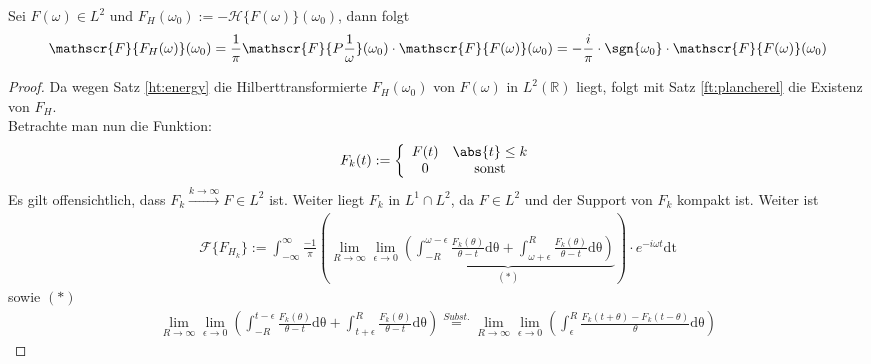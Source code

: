 \begin{satz}\label{kkt:FourierHilbert}
Sei  $F(\omega) \in L^2$ und $F_H(\omega_0):=-\mathscr{H}\{F(\omega)\}{(\omega_0)}$, dann folgt
\begin{align}
	 \mathscr{F}\{F_H(\omega)\}(\omega_0) = \frac{1}{\pi} \mathscr{F}\{P\frac{1}{\omega}\}(\omega_0) \cdot \mathscr{F}\{F(\omega)\}(\omega_0)  = -\frac{i}{\pi} \cdot \sgn{\omega_0} \cdot \mathscr{F}\{F(\omega)\}(\omega_0) \label{kkt:fft}
\end{align}
\begin{proof}
Da wegen Satz \ref{ht:energy} die Hilberttransformierte $F_H(\omega_0)$ von $F(\omega)$ in $L^2(\mathbb{R})$ liegt, folgt mit Satz \ref{ft:plancherel} die Existenz von $F_H$. \\ 
Betrachte man nun die Funktion:
\begin{align}
	F_k(t) := \left\{\begin{array}{cc}
	F(t) & \abs{t} \leq k \\ 
	0 & \text{ sonst }
	\end{array} \right.
\end{align}
Es gilt offensichtlich, dass $F_k \stackrel{k  \rightarrow \infty}{\rightarrow} F \in L^2$ ist. Weiter liegt $F_k$ in $L^1 \cap L^2$, da $F \in L^2$ und der Support von $F_k$ kompakt ist. Weiter ist   
\begin{align}
\mathscr{F}\{F_{H_k}\} :=  \int_{-\infty}^{\infty} \frac{-1}{\pi} \left( \lim_{R \rightarrow \infty} \lim_{\epsilon \rightarrow 0} \underbrace{\left(\int_{-R}^{\omega - \epsilon} \frac{F_k(\theta)}{\theta - t} \mathrm{d\theta}  + \int_{\omega + \epsilon}^{R} \frac{F_k(\theta)}{\theta - t} \mathrm{d\theta}\right)}_{(*)} \right) \cdot e^{-i \omega t} \mathrm{dt} 
\end{align}
sowie  $(*)$
\begin{align}
\lim_{R \rightarrow \infty} \lim_{\epsilon \rightarrow 0} \left(\int_{-R}^{t - \epsilon} \frac{F_k(\theta)}{\theta - t} \mathrm{d\theta}  + \int_{t + \epsilon}^{R} \frac{F_k(\theta)}{\theta - t} \mathrm{d\theta}\right) \stackrel{Subst.}{=} \lim_{R \rightarrow \infty} \lim_{\epsilon \rightarrow 0} \left( \int_{\epsilon}^{R} \frac{F_k(t + \theta)- F_k(t - \theta)}{\theta} \mathrm{d\theta} \right)

\end{align}
\end{proof}
\end{satz}
